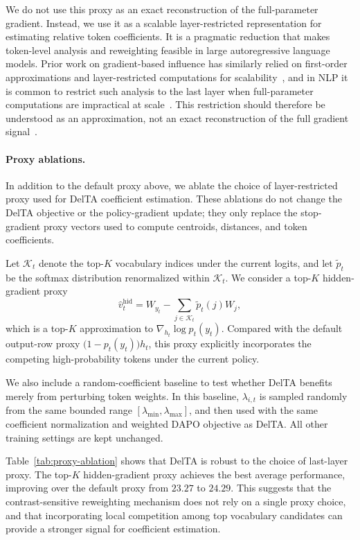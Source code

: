 \documentclass{article} %
\begin{document}
We do not use this proxy as an exact reconstruction of the full-parameter gradient.  Instead, we use it as a scalable layer-restricted representation for estimating relative token coefficients. It is a pragmatic reduction that makes token-level analysis and reweighting feasible in large autoregressive language models. Prior work on gradient-based influence has similarly relied on first-order approximations and layer-restricted computations for scalability~\citep{pruthi2020estimating}, and in NLP it is common to restrict such analysis to the last layer when
full-parameter computations are impractical at scale~\citep{yeh2022first}.
This restriction should therefore be understood as an approximation, not an
exact reconstruction of the full gradient signal~\citep{yeh2022first}.

\paragraph{Proxy ablations.}
In addition to the default proxy above, we ablate the choice of layer-restricted
proxy used for DelTA coefficient estimation. These ablations do not change the
DelTA objective or the policy-gradient update; they only replace the
stop-gradient proxy vectors used to compute centroids, distances, and token
coefficients.

Let \(\mathcal K_t\) denote the top-\(K\) vocabulary indices under the current
logits, and let \(\widetilde p_t\) be the softmax distribution renormalized
within \(\mathcal K_t\). We consider a top-\(K\) hidden-gradient proxy
\[
\widehat v^{\mathrm{hid}}_t
=
W_{y_t}
-
\sum_{j\in\mathcal K_t}
\widetilde p_t(j) W_j,
\]
which is a top-\(K\) approximation to
\(\nabla_{h_t}\log p_t(y_t)\). Compared with the default output-row proxy
\(\bigl(1-p_t(y_t)\bigr)h_t\), this proxy explicitly incorporates the competing
high-probability tokens under the current policy.

We also include a random-coefficient baseline to test whether DelTA benefits
merely from perturbing token weights. In this baseline, \(\lambda_{i,t}\) is
sampled randomly from the same bounded range
\([\lambda_{\min},\lambda_{\max}]\), and then used with the same coefficient
normalization and weighted DAPO objective as DelTA. All other training settings
are kept unchanged.


Table~\ref{tab:proxy-ablation} shows that DelTA is robust to the choice of
last-layer proxy. The top-\(K\) hidden-gradient proxy achieves the best average
performance, improving over the default proxy from \(23.27\) to \(24.29\).
This suggests that the contrast-sensitive reweighting mechanism does not rely
on a single proxy choice, and that incorporating local competition among top
vocabulary candidates can provide a stronger signal for coefficient estimation.
\end{document}
